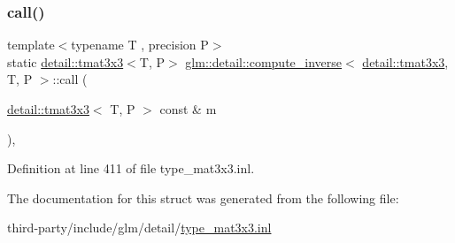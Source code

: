 \subsubsection{\texorpdfstring{call()}{call()}}
{\footnotesize\ttfamily template$<$typename T , precision P$>$ \\
static \hyperlink{structglm_1_1detail_1_1tmat3x3}{detail\+::tmat3x3}$<$T, P$>$ \hyperlink{structglm_1_1detail_1_1compute__inverse}{glm\+::detail\+::compute\+\_\+inverse}$<$ \hyperlink{structglm_1_1detail_1_1tmat3x3}{detail\+::tmat3x3}, T, P $>$\+::call (\begin{DoxyParamCaption}\item[{\hyperlink{structglm_1_1detail_1_1tmat3x3}{detail\+::tmat3x3}$<$ T, P $>$ const \&}]{m }\end{DoxyParamCaption})\hspace{0.3cm}{\ttfamily [inline]}, {\ttfamily [static]}}



Definition at line 411 of file type\+\_\+mat3x3.\+inl.



The documentation for this struct was generated from the following file\+:\begin{DoxyCompactItemize}
\item 
third-\/party/include/glm/detail/\hyperlink{type__mat3x3_8inl}{type\+\_\+mat3x3.\+inl}\end{DoxyCompactItemize}

